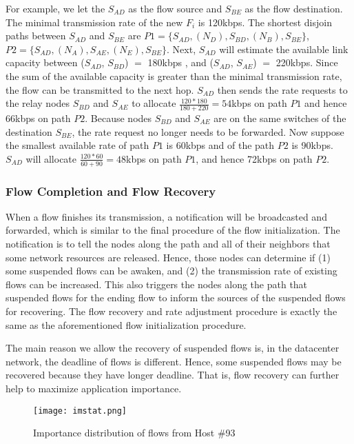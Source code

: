 \documentclass[conference]{IEEEtran}
\begin{document}
For example, we let the $S_{AD}$ as the flow source and $S_{BE}$ as the flow destination. The minimal transmission rate of the new $F_{i}$ is 120kbps. The shortest disjoin paths between $S_{AD}$ and $S_{BE}$ are $P1=\{S_{AD}, (N_{D}), S_{BD}, (N_{B}), S_{BE}\}$, $P2=\{S_{AD}, (N_{A}), S_{AE}, (N_{E}), S_{BE}\}$. Next, $S_{AD}$ will estimate the available link capacity between ($S_{AD}$, $S_{BD}$) $=$ 180kbps , and ($S_{AD}$, $S_{AE}$) $=$ 220kbps. Since the sum of the available capacity is greater than the minimal transmission rate, the flow can be transmitted to the next hop. $S_{AD}$ then sends the rate requests to the relay nodes $S_{BD}$ and $S_{AE}$ to allocate $\frac{120\ast180}{180+220}=54$kbps on path $P1$ and hence 66kbps on path $P2$. Because nodes $S_{BD}$ and $S_{AE}$ are on the same switches of the destination $S_{BE}$, the rate request no longer needs to be forwarded. Now suppose the smallest available rate of path $P1$ is 60kbps and of the path $P2$ is 90kbps. $S_{AD}$ will allocate $\frac{120\ast60}{60+90}=48$kbps on path $P1$, and hence 72kbps on path $P2$.

\subsubsection{Flow Completion and Flow Recovery}

When a flow finishes its transmission, a notification will be broadcasted and forwarded, which is similar to the final procedure of the flow initialization. The notification is to tell the nodes along the path and all of their neighbors that some network resources are released. Hence, those nodes can determine if (1) some suspended flows can be awaken, and (2) the transmission rate of existing flows can be increased. This also triggers the nodes along the path that suspended flows for the ending flow to inform the sources of the suspended flows for recovering. The flow recovery and rate adjustment procedure is exactly the same as the aforementioned flow initialization procedure.

The main reason we allow the recovery of suspended flows is, in the datacenter network, the deadline of flows is different. Hence, some suspended flows may be recovered because they have longer deadline. That is, flow recovery can further help to maximize application importance.



\begin{figure}
  \centering
\texttt{[image: imstat.png]}\\
  \caption{Importance distribution of flows from Host \#93}\label{fig:imstat}
\end{figure}
\end{document}
